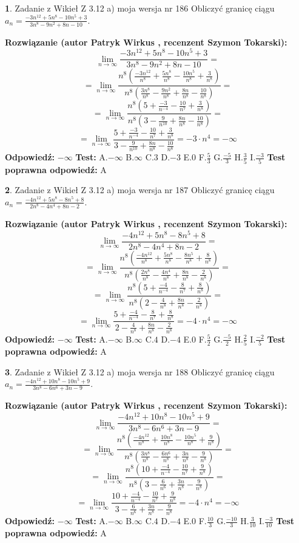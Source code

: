\documentclass[12pt, a4paper]{article}
\theoremstyle{definition} %
\newtheorem{zad}{}
\newcommand{\zadStart}[1]{\begin{zad}#1\newline}
\newcommand{\zadStop}{\end{zad}}
\newcommand{\rozwStart}[2]{\noindent \textbf{Rozwiązanie (autor #1 , recenzent #2): }\newline}
\newcommand{\rozwStop}{\newline}
\newcommand{\odpStart}{\noindent \textbf{Odpowiedź:}\newline}
\newcommand{\odpStop}{\newline}
\newcommand{\testStart}{\noindent \textbf{Test:}\newline}
\newcommand{\testStop}{\newline}
\newcommand{\kluczStart}{\noindent \textbf{Test poprawna odpowiedź:}\newline}
\newcommand{\kluczStop}{\newline}
\begin{document}
\zadStart{Zadanie z Wikieł Z 3.12 a) moja wersja nr 186}
Obliczyć granicę ciągu $a_{n}=\frac{-3n^{12}+5n^{8}-10n^{5}+3}{3n^{8}-9n^{2}+8n-10}$.
\zadStop
\rozwStart{Patryk Wirkus}{Szymon Tokarski}
$$\lim\limits_{n\to\infty}\frac{-3n^{12}+5n^{8}-10n^{5}+3}{3n^{8}-9n^{2}+8n-10}=$$
$$=\lim\limits_{n\to\infty}\frac{n^{8}\left(\frac{-3n^{12}}{n^{8}}+\frac{5n^{8}}{n^{8}}-\frac{10n^{5}}{n^{8}}+\frac{3}{n^{8}}\right)}{n^{8}\left(\frac{3n^{8}}{n^{8}}-\frac{9n^{2}}{n^{8}}+\frac{8n}{n^{8}}-\frac{10}{n^{8}}\right)}=$$
$$=\lim\limits_{n\to\infty}\frac{n^{8}\left(5+\frac{-3}{n^{-4}}-\frac{10}{n^{7}}+\frac{3}{n^{8}}\right)}
{n^{8}\left(3-\frac{9}{n^{10}}+\frac{8n}{n^{8}}-\frac{10}{n^{8}}\right)}=$$
$$=\lim\limits_{n\to\infty}\frac{5+\frac{-3}{n^{-4}}-\frac{10}{n^{7}}+\frac{3}{n^{8}}}{3-\frac{9}{n^{10}}+\frac{8n}{n^{8}}-\frac{10}{n^{8}}}=-3\cdot n^{4} = -\infty$$
\rozwStop
\odpStart
$-\infty$
\odpStop
\testStart
A.$-\infty$
B.$\infty$
C.$3$
D.$-3$
E.$0$
F.$\frac{5}{3}$
G.$\frac{-5}{3}$
H.$\frac{3}{5}$
I.$\frac{-3}{5}$
\testStop
\kluczStart
A
\kluczStop



\zadStart{Zadanie z Wikieł Z 3.12 a) moja wersja nr 187}
Obliczyć granicę ciągu $a_{n}=\frac{-4n^{12}+5n^{8}-8n^{5}+8}{2n^{8}-4n^{4}+8n-2}$.
\zadStop
\rozwStart{Patryk Wirkus}{Szymon Tokarski}
$$\lim\limits_{n\to\infty}\frac{-4n^{12}+5n^{8}-8n^{5}+8}{2n^{8}-4n^{4}+8n-2}=$$
$$=\lim\limits_{n\to\infty}\frac{n^{8}\left(\frac{-4n^{12}}{n^{8}}+\frac{5n^{8}}{n^{8}}-\frac{8n^{5}}{n^{8}}+\frac{8}{n^{8}}\right)}{n^{8}\left(\frac{2n^{8}}{n^{8}}-\frac{4n^{4}}{n^{8}}+\frac{8n}{n^{8}}-\frac{2}{n^{8}}\right)}=$$
$$=\lim\limits_{n\to\infty}\frac{n^{8}\left(5+\frac{-4}{n^{-4}}-\frac{8}{n^{7}}+\frac{8}{n^{8}}\right)}
{n^{8}\left(2-\frac{4}{n^{8}}+\frac{8n}{n^{8}}-\frac{2}{n^{8}}\right)}=$$
$$=\lim\limits_{n\to\infty}\frac{5+\frac{-4}{n^{-4}}-\frac{8}{n^{7}}+\frac{8}{n^{8}}}{2-\frac{4}{n^{8}}+\frac{8n}{n^{8}}-\frac{2}{n^{8}}}=-4\cdot n^{4} = -\infty$$
\rozwStop
\odpStart
$-\infty$
\odpStop
\testStart
A.$-\infty$
B.$\infty$
C.$4$
D.$-4$
E.$0$
F.$\frac{5}{2}$
G.$\frac{-5}{2}$
H.$\frac{2}{5}$
I.$\frac{-2}{5}$
\testStop
\kluczStart
A
\kluczStop



\zadStart{Zadanie z Wikieł Z 3.12 a) moja wersja nr 188}
Obliczyć granicę ciągu $a_{n}=\frac{-4n^{12}+10n^{8}-10n^{5}+9}{3n^{8}-6n^{6}+3n-9}$.
\zadStop
\rozwStart{Patryk Wirkus}{Szymon Tokarski}
$$\lim\limits_{n\to\infty}\frac{-4n^{12}+10n^{8}-10n^{5}+9}{3n^{8}-6n^{6}+3n-9}=$$
$$=\lim\limits_{n\to\infty}\frac{n^{8}\left(\frac{-4n^{12}}{n^{8}}+\frac{10n^{8}}{n^{8}}-\frac{10n^{5}}{n^{8}}+\frac{9}{n^{8}}\right)}{n^{8}\left(\frac{3n^{8}}{n^{8}}-\frac{6n^{6}}{n^{8}}+\frac{3n}{n^{8}}-\frac{9}{n^{8}}\right)}=$$
$$=\lim\limits_{n\to\infty}\frac{n^{8}\left(10+\frac{-4}{n^{-4}}-\frac{10}{n^{7}}+\frac{9}{n^{8}}\right)}
{n^{8}\left(3-\frac{6}{n^{6}}+\frac{3n}{n^{8}}-\frac{9}{n^{8}}\right)}=$$
$$=\lim\limits_{n\to\infty}\frac{10+\frac{-4}{n^{-4}}-\frac{10}{n^{7}}+\frac{9}{n^{8}}}{3-\frac{6}{n^{6}}+\frac{3n}{n^{8}}-\frac{9}{n^{8}}}=-4\cdot n^{4} = -\infty$$
\rozwStop
\odpStart
$-\infty$
\odpStop
\testStart
A.$-\infty$
B.$\infty$
C.$4$
D.$-4$
E.$0$
F.$\frac{10}{3}$
G.$\frac{-10}{3}$
H.$\frac{3}{10}$
I.$\frac{-3}{10}$
\testStop
\kluczStart
A
\kluczStop
\end{document}
